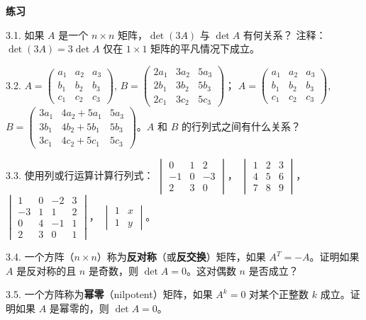\textbf{练习}~

3.1. 如果 $A$ 是一个 $n \times n$ 矩阵，$\det(3A)$ 与 $\det A$ 有何关系？
注释：$\det(3A) = 3 \det A$ 仅在 $1 \times 1$ 矩阵的平凡情况下成立。

3.2. $A = \begin{pmatrix} a_1 & a_2 & a_3 \\ b_1 & b_2 & b_3 \\ c_1 & c_2 & c_3 \end{pmatrix}$, $B = \begin{pmatrix} 2a_1 & 3a_2 & 5a_3 \\ 2b_1 & 3b_2 & 5b_3 \\ 2c_1 & 3c_2 & 5c_3 \end{pmatrix}$；
$A = \begin{pmatrix} a_1 & a_2 & a_3 \\ b_1 & b_2 & b_3 \\ c_1 & c_2 & c_3 \end{pmatrix}$, $B = \begin{pmatrix} 3a_1 & 4a_2 + 5a_1 & 5a_3 \\ 3b_1 & 4b_2 + 5b_1 & 5b_3 \\ 3c_1 & 4c_2 + 5c_1 & 5c_3 \end{pmatrix}$。$A$ 和 $B$ 的行列式之间有什么关系？

3.3. 使用列或行运算计算行列式：
$\begin{vmatrix} 0 & 1 & 2 \\ -1 & 0 & -3 \\ 2 & 3 & 0 \end{vmatrix}$， $\begin{vmatrix} 1 & 2 & 3 \\ 4 & 5 & 6 \\ 7 & 8 & 9 \end{vmatrix}$， $\begin{vmatrix} 1 & 0 & -2 & 3 \\ -3 & 1 & 1 & 2 \\ 0 & 4 & -1 & 1 \\ 2 & 3 & 0 & 1 \end{vmatrix}$， $\begin{vmatrix} 1 & x \\ 1 & y \end{vmatrix}$。

3.4. 一个方阵（$n \times n$）称为\textbf{反对称}（或\textbf{反交换}）矩阵，如果 $A^T = -A$。证明如果 $A$ 是反对称的且 $n$ 是奇数，则 $\det A = 0$。这对偶数 $n$ 是否成立？

3.5. 一个方阵称为\textbf{幂零}（nilpotent）矩阵，如果 $A^k = 0$ 对某个正整数 $k$ 成立。证明如果 $A$ 是幂零的，则 $\det A = 0$。

